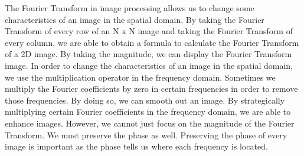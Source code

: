 \documentclass [../article.tex]{subfiles}
\begin{document}
  The Fourier Transform in image processing allows us to change some
  characteristics of an image in the spatial domain.  By taking the
  Fourier Transform of every row of an N x N image and taking the
  Fourier Transform of every column, we are able to obtain a formula
  to calculate the Fourier Transform of a 2D image.  By taking the
  magnitude, we can display the Fourier Transform image.  In order
  to change the characteristics of an image in the spatial domain,
  we use the multiplication operator in the frequency domain.
  Sometimes we multiply the Fourier coefficients by zero in certain
  frequencies in order to remove those frequencies.  By doing so, we
  can smooth out an image.  By strategically multiplying certain
  Fourier coefficients in the frequency domain, we are able to
  enhance images.  However, we cannot just focus on the magnitude of
  the Fourier Transform.  We must preserve the phase as well.
  Preserving the phase of every image is important as the phase
  tells us where each frequency is located.
\end{document}
